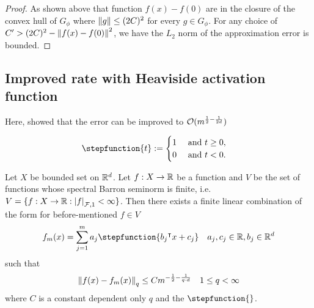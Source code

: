 \begin{proof}
    As shown above that function $f(x) - f(0)$ are in the closure of the convex
    hull of $G_{\phi}$ where $\left\| g \right\| \leq (2C)^2$ for every $g \in G_{\phi}$.
    For any choice of $C' > (2C)^2 - \left\| f(x) - f(0) \right\|^2$, we have the $L_2$
    norm of the approximation error is bounded.




\end{proof}



\subsection{Improved rate with Heaviside activation function}

Here, \cite{makovozRandomApproximantsNeural1996} showed that the error can be
improved to $\mathcal{O}(m^{\frac{1}{2} - \frac{1}{2d}})$

\begin{definition}
    \begin{equation}
        \stepfunction{t} := 
        \begin{cases}
            1 \quad \text{ and } t \geq 0,\\
            0 \quad \text{ and } t < 0.
        \end{cases}
    \end{equation}
\end{definition}


\begin{theorem}\cite[Theorem 3]{makovozRandomApproximantsNeural1996}
    \label{thm:improve_barron}
    
    Let $X$ be bounded set on $\mathbb{R}^d$. Let $f: X \to \mathbb{R}$ be a function and $V$ be
    the set of functions whose spectral Barron seminorm is finite, i.e. $V =
    \{f: X\to\mathbb{R} : \left| f \right|_{\mathcal{F}, {1}} < \infty\}$. Then there exists a finite
    linear combination of the form for before-mentioned $f \in V$
    \begin{equation}
        f_m(x) = \sum_{j=1}^m a_j \stepfunction{b_j\tr x + c_j} \quad 
            a_j, c_j \in \R, b_j \in \R^d
    \end{equation}
    such that 
    \begin{equation}
        \left\| f(x) - f_m(x) \right\|_{q} \leq C m^{-\frac{1}{2} - \frac{1}{q \cdot d}}
        \quad 1 \leq q < \infty
    \end{equation}
    where $C$ is a constant dependent only $q$ and the  $\stepfunction{}$.
\end{theorem}

